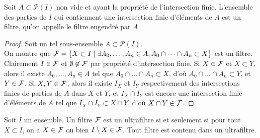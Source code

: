 \begin{prop}
Soit $A \subset \mathcal{P}(I)$ non vide et ayant la propriété de l'intersection finie. L'ensemble des parties de $I$ qui contiennent une intersection finie 
d'éléments de $A$ est un filtre, qu'on appelle le filtre engendré par $A$.
\end{prop}

\begin{proof}
Soit un tel sous-ensemble $A \subset \mathcal{P}(I)$.\\ On montre que $ \mathcal{F} = \{ X \subset I \mid \exists A_0,\dots,A_n \in A, A_0 \cap \dots \cap A_n \subset X \}$ est un filtre.
Clairement $I \in \mathcal{F}$ et $\emptyset \not\in \mathcal{F}$ par propriété d'intersection finie. Si $X \in \mathcal{F}$ et $X \subset Y$, alors il existe $A_0,\dots,A_n \in A$
tel que $A_0 \cap \dots \cap A_n \subset X$, d'où $A_0 \cap \dots \cap A_n \subset Y$, et $Y \in \mathcal{F}$. Si $X,Y \in \mathcal{F}$, alors il existe $I_X$ et $I_Y$ respectivement
des intersections finies de parties de $A$ dans $X$ et $Y$, et $I_X \cap I_Y$ est encore une intersection finie d'éléments de $A$ tel que $I_X \cap I_Y \subset X \cap Y$,
d'où $X \cap Y \in \mathcal{F}$.
\end{proof}

\begin{prop}\label{lemmelos}
Soit $I$ un ensemble. Un filtre $\mathcal{F}$ est un ultrafiltre si et seulement si pour tout $X \subset I$, on a $X \in \mathcal{F}$ ou bien $I \setminus X \in \mathcal{F}$.
Tout filtre est contenu dans un ultrafiltre.
\end{prop}

